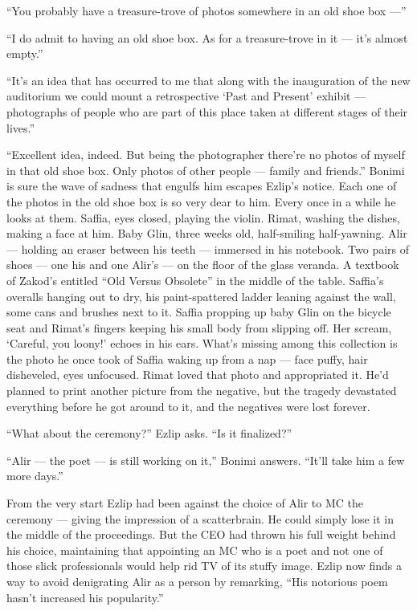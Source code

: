 \documentclass[twoside,11pt,openany]{book}
\begin{document}
``You probably have a treasure-trove of photos somewhere in an old shoe box ---''

``I do admit to having an old shoe box. As for a treasure-trove in it --- it's almost
empty.''

``It's an idea that has occurred to me that along with the inauguration of the new auditorium we could
mount a retrospective `Past and Present' exhibit --- photographs of people who are part of this place taken at
different stages of their lives.''

``Excellent idea, indeed. But being the photographer there're no photos of myself in that old shoe box.
Only photos of other people --- family and friends.'' Bonimi is sure the wave of sadness that engulfs him
escapes Ezlip's notice.  Each one of the photos in the old shoe box is so very dear to him. Every once in a while he
looks at them. Saffia, eyes closed, playing the violin. Rimat, washing the dishes, making a face at him. Baby Glin,
three weeks old, half-smiling half-yawning. Alir --- holding an eraser between his teeth --- immersed in his notebook. Two
pairs of shoes --- one his and one Alir's --- on the floor of the glass veranda. A textbook of Zakod's entitled
``Old Versus Obsolete'' in the middle of the table. Saffia's overalls hanging out to dry, his
paint-spattered ladder leaning against the wall, some cans and brushes next to it.  Saffia propping up baby Glin on the
bicycle seat and Rimat's fingers keeping his small body from slipping off.  Her scream, `Careful, you loony!' echoes in
his ears. What's missing among this collection is the photo he once took of Saffia waking up from a nap --- face puffy,
hair disheveled,{ }{eyes
unfocused.}  Rimat loved that photo and appropriated it. He'd planned to print another picture from the negative, but
the tragedy devastated everything before he got around to it, and the negatives were lost forever.

``What about the ceremony?'' Ezlip asks. ``Is it finalized?''

``Alir --- the poet --- is still working on it,'' Bonimi answers. ``It'll take him a
few more days.''

From the very start Ezlip had been against the choice of Alir to MC the ceremony --- giving the impression of a
scatterbrain. He could simply lose it in the middle of the proceedings. But the CEO had thrown his full weight behind
his choice, maintaining that appointing an MC who is a poet and not one of those slick professionals would help rid TV
of its stuffy image.  Ezlip now finds a way to avoid denigrating Alir as a person by remarking,
``His notorious poem hasn't increased his popularity.''
\end{document}
